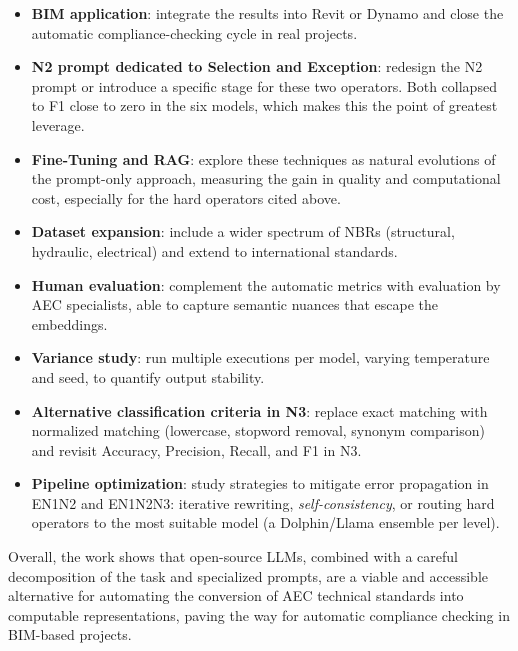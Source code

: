 \documentclass[a4paper,fleqn]{cas-sc}
\begin{document}
\begin{itemize}
    \item \textbf{BIM application}: integrate the results into Revit or Dynamo and close the automatic compliance-checking cycle in real projects.
    \item \textbf{N2 prompt dedicated to Selection and Exception}: redesign the N2 prompt or introduce a specific stage for these two operators. Both collapsed to F1 close to zero in the six models, which makes this the point of greatest leverage.
    \item \textbf{Fine-Tuning and RAG}: explore these techniques as natural evolutions of the prompt-only approach, measuring the gain in quality and computational cost, especially for the hard operators cited above.
    \item \textbf{Dataset expansion}: include a wider spectrum of NBRs (structural, hydraulic, electrical) and extend to international standards.
    \item \textbf{Human evaluation}: complement the automatic metrics with evaluation by AEC specialists, able to capture semantic nuances that escape the embeddings.
    \item \textbf{Variance study}: run multiple executions per model, varying temperature and seed, to quantify output stability.
    \item \textbf{Alternative classification criteria in N3}: replace exact matching with normalized matching (lowercase, stopword removal, synonym comparison) and revisit Accuracy, Precision, Recall, and F1 in N3.
    \item \textbf{Pipeline optimization}: study strategies to mitigate error propagation in EN1N2 and EN1N2N3: iterative rewriting, \textit{self-consistency}, or routing hard operators to the most suitable model (a Dolphin/Llama ensemble per level).
\end{itemize}

Overall, the work shows that open-source LLMs, combined with a careful decomposition of the task and specialized prompts, are a viable and accessible alternative for automating the conversion of AEC technical standards into computable representations, paving the way for automatic compliance checking in BIM-based projects.

\printcredits



\end{document}
